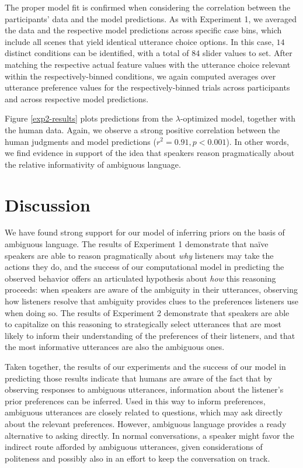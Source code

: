 \documentclass[10pt,a4paper]{article}
\begin{document}
The proper model fit is confirmed when considering the correlation between the participants' data and the model predictions. 
As with Experiment 1, we averaged the data and the respective model predictions across specific case bins, which include all scenes that yield identical utterance choice options. 
In this case, $14$ distinct conditions can be identified, with a total of $84$ slider values to set. 
After matching the respective actual feature values with the utterance choice relevant within the respectively-binned conditions, we again computed averages over utterance preference values for the respectively-binned trials across participants and across respective model predictions. 


Figure \ref{exp2-results} plots predictions from the $\lambda$-optimized model, together with the human data. Again, we observe a strong positive correlation between the human judgments and model predictions ($r^2 = 0.91, p < 0.001$). In other words, we find evidence in support of the idea that speakers reason pragmatically about the relative informativity of ambiguous language.



\section{Discussion}

We have found strong support for our model of inferring priors on the basis of ambiguous language.
The results of Experiment 1 demonstrate that na\"ive speakers are able to reason pragmatically about \emph{why} listeners may take the actions they do, and the success of our computational model in predicting the observed behavior offers an articulated hypothesis about \emph{how} this reasoning proceeds: when speakers are aware of the ambiguity in their utterances, observing how listeners resolve that ambiguity provides clues to the preferences listeners use when doing so.
The results of Experiment 2 demonstrate that speakers are able to capitalize on this reasoning to strategically select utterances that are most likely to inform their understanding of the preferences of their listeners, and that the most informative utterances are also the ambiguous ones.

Taken together, the results of our experiments and the success of our model in predicting those results indicate that humans are aware of the fact that by observing responses to ambiguous utterances, information about the listener's prior preferences can be inferred. 
Used in this way to inform preferences, ambiguous utterances are closely related to questions, which may ask directly about the  relevant preferences. 
However, ambiguous language provides a ready alternative to asking directly. In normal conversations, a speaker might favor the indirect route afforded by ambiguous utterances, given considerations of politeness and possibly also in an effort to keep the conversation on track.  
\end{document}
